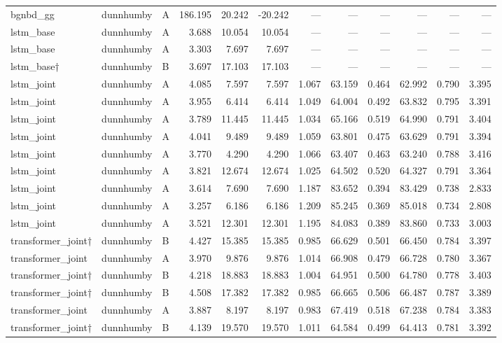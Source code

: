 \begin{table}
\begin{tabular}{lllrrrrrrrrr}
bgnbd_gg & dunnhumby & A & 186.195 & 20.242 & -20.242 & — & — & — & — & — & — \\
lstm_base & dunnhumby & A & 3.688 & 10.054 & 10.054 & — & — & — & — & — & — \\
lstm_base & dunnhumby & A & 3.303 & 7.697 & 7.697 & — & — & — & — & — & — \\
lstm_base† & dunnhumby & B & 3.697 & 17.103 & 17.103 & — & — & — & — & — & — \\
lstm_joint & dunnhumby & A & 4.085 & 7.597 & 7.597 & 1.067 & 63.159 & 0.464 & 62.992 & 0.790 & 3.395 \\
lstm_joint & dunnhumby & A & 3.955 & 6.414 & 6.414 & 1.049 & 64.004 & 0.492 & 63.832 & 0.795 & 3.391 \\
lstm_joint & dunnhumby & A & 3.789 & 11.445 & 11.445 & 1.034 & 65.166 & 0.519 & 64.990 & 0.791 & 3.404 \\
lstm_joint & dunnhumby & A & 4.041 & 9.489 & 9.489 & 1.059 & 63.801 & 0.475 & 63.629 & 0.791 & 3.394 \\
lstm_joint & dunnhumby & A & 3.770 & 4.290 & 4.290 & 1.066 & 63.407 & 0.463 & 63.240 & 0.788 & 3.416 \\
lstm_joint & dunnhumby & A & 3.821 & 12.674 & 12.674 & 1.025 & 64.502 & 0.520 & 64.327 & 0.791 & 3.364 \\
lstm_joint & dunnhumby & A & 3.614 & 7.690 & 7.690 & 1.187 & 83.652 & 0.394 & 83.429 & 0.738 & 2.833 \\
lstm_joint & dunnhumby & A & 3.257 & 6.186 & 6.186 & 1.209 & 85.245 & 0.369 & 85.018 & 0.734 & 2.808 \\
lstm_joint & dunnhumby & A & 3.521 & 12.301 & 12.301 & 1.195 & 84.083 & 0.389 & 83.860 & 0.733 & 3.003 \\
transformer_joint† & dunnhumby & B & 4.427 & 15.385 & 15.385 & 0.985 & 66.629 & 0.501 & 66.450 & 0.784 & 3.397 \\
transformer_joint & dunnhumby & A & 3.970 & 9.876 & 9.876 & 1.014 & 66.908 & 0.479 & 66.728 & 0.780 & 3.367 \\
transformer_joint† & dunnhumby & B & 4.218 & 18.883 & 18.883 & 1.004 & 64.951 & 0.500 & 64.780 & 0.778 & 3.403 \\
transformer_joint† & dunnhumby & B & 4.508 & 17.382 & 17.382 & 0.985 & 66.665 & 0.506 & 66.487 & 0.787 & 3.389 \\
transformer_joint & dunnhumby & A & 3.887 & 8.197 & 8.197 & 0.983 & 67.419 & 0.518 & 67.238 & 0.784 & 3.383 \\
transformer_joint† & dunnhumby & B & 4.139 & 19.570 & 19.570 & 1.011 & 64.584 & 0.499 & 64.413 & 0.781 & 3.392 \\

\end{tabular}
\end{table}
